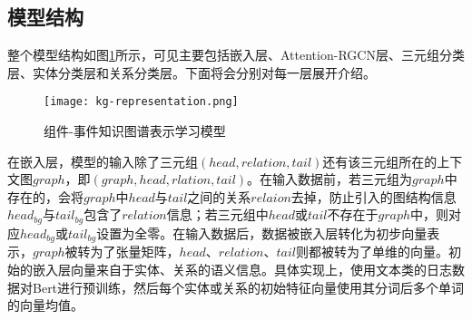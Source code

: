 \subsection{模型结构}
整个模型结构如图\ref{kg-representation}所示，可见主要包括嵌入层、Attention-RGCN层、三元组分类层、实体分类层和关系分类层。下面将会分别对每一层展开介绍。
\begin{figure}[htbp]
    \centering
    \texttt{[image: kg-representation.png]}
    \caption{组件-事件知识图谱表示学习模型\label{kg-representation}}
\end{figure}

在嵌入层，模型的输入除了三元组$(head, relation, tail)$还有该三元组所在的上下文图$graph$，即$(graph, head,rlation,tail)$。在输入数据前，若三元组为$graph$中存在的，会将$graph$中$head$与$tail$之间的关系$relaion$去掉，防止引入的图结构信息$head_{bg}$与$tail_{bg}$包含了$relation$信息；若三元组中$head$或$tail$不存在于$graph$中，则对应$head_{bg}$或$tail_{bg}$设置为全零。在输入数据后，数据被嵌入层转化为初步向量表示，$graph$被转为了张量矩阵，$head$、$relation$、$tail$则都被转为了单维的向量。初始的嵌入层向量来自于实体、关系的语义信息。具体实现上，使用文本类的日志数据对Bert\cite{devlin2018bert}进行预训练，然后每个实体或关系的初始特征向量使用其分词后多个单词的向量均值。

